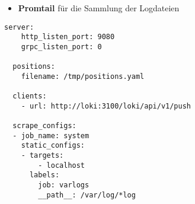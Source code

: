 \newpage
\begin{itemize}[noitemsep]
    \item \textbf{Promtail} für die Sammlung der Logdateien 
\end{itemize}

{
\begin{Verbatim}[frame=single]
    server:
    http_listen_port: 9080
    grpc_listen_port: 0
  
  positions:
    filename: /tmp/positions.yaml
  
  clients:
    - url: http://loki:3100/loki/api/v1/push
  
  scrape_configs:
  - job_name: system
    static_configs:
    - targets:
        - localhost
      labels:
        job: varlogs
        __path__: /var/log/*log
  
\end{Verbatim}
}